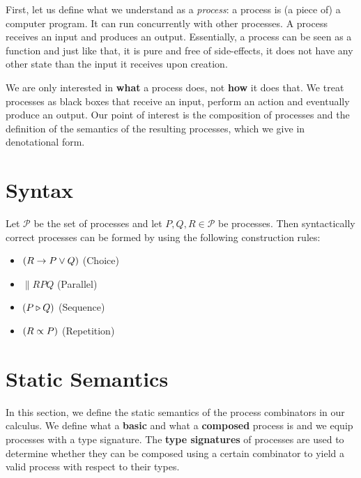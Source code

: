 First, let us define what we understand as a \textit{process}: a process is (a piece of) a computer program. It can run concurrently with other processes. A process receives an input and produces an output. Essentially, a process can be seen as a function and just like that, it is pure and free of side-effects, it does not have any other state than the input it receives upon creation.

We are only interested in \textbf{what} a process does, not \textbf{how} it does that. We treat processes as black boxes that receive an input, perform an action and eventually produce an output. Our point of interest is the composition of processes and the definition of the semantics of the resulting processes, which we give in denotational form.

\section{Syntax}
\label{chp:syntax}
Let $\mathcal{P}$ be the set of processes and let $P, Q, R \in \mathcal{P}$ be processes. Then syntactically correct processes can be formed by using the following construction rules:
\begin{itemize}
  \item $\left( R \to P \vee Q \right)$ \hspace*{2.3em} (Choice)
  \item $\parallel{R}{P}{Q}$ \hspace*{2.8em} (Parallel)
  \item $\left( P \triangleright Q \right)$ \hspace*{4.8em} (Sequence)
  \item $\left( R \propto P \right)$ \hspace*{4.4em} (Repetition)
\end{itemize}



\section{Static Semantics}
\label{chp:static_semantics}
In this section, we define the static semantics of the process combinators in our calculus. We define what a \textbf{basic} and what a \textbf{composed} process is and we equip processes with a type signature. The \textbf{type signatures} of processes are used to determine whether they can be composed using a certain combinator to yield a valid process with respect to their types.

